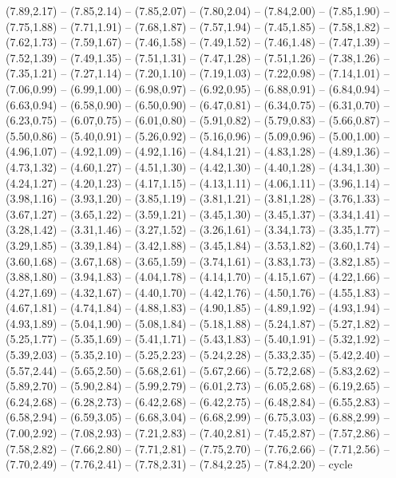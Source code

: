 \expandafter\def\csname geo:gebiet:heute-AUT\endcsname{
  (7.89,2.17) -- (7.85,2.14) -- (7.85,2.07) -- (7.80,2.04) -- (7.84,2.00) -- (7.85,1.90) -- (7.75,1.88) -- (7.71,1.91) -- (7.68,1.87) -- (7.57,1.94) -- (7.45,1.85) -- (7.58,1.82) -- (7.62,1.73) -- (7.59,1.67) -- (7.46,1.58) -- (7.49,1.52) -- (7.46,1.48) -- (7.47,1.39) -- (7.52,1.39) -- (7.49,1.35) -- (7.51,1.31) -- (7.47,1.28) -- (7.51,1.26) -- (7.38,1.26) -- (7.35,1.21) -- (7.27,1.14) -- (7.20,1.10) -- (7.19,1.03) -- (7.22,0.98) -- (7.14,1.01) -- (7.06,0.99) -- (6.99,1.00) -- (6.98,0.97) -- (6.92,0.95) -- (6.88,0.91) -- (6.84,0.94) -- (6.63,0.94) -- (6.58,0.90) -- (6.50,0.90) -- (6.47,0.81) -- (6.34,0.75) -- (6.31,0.70) -- (6.23,0.75) -- (6.07,0.75) -- (6.01,0.80) -- (5.91,0.82) -- (5.79,0.83) -- (5.66,0.87) -- (5.50,0.86) -- (5.40,0.91) -- (5.26,0.92) -- (5.16,0.96) -- (5.09,0.96) -- (5.00,1.00) -- (4.96,1.07) -- (4.92,1.09) -- (4.92,1.16) -- (4.84,1.21) -- (4.83,1.28) -- (4.89,1.36) -- (4.73,1.32) -- (4.60,1.27) -- (4.51,1.30) -- (4.42,1.30) -- (4.40,1.28) -- (4.34,1.30) -- (4.24,1.27) -- (4.20,1.23) -- (4.17,1.15) -- (4.13,1.11) -- (4.06,1.11) -- (3.96,1.14) -- (3.98,1.16) -- (3.93,1.20) -- (3.85,1.19) -- (3.81,1.21) -- (3.81,1.28) -- (3.76,1.33) -- (3.67,1.27) -- (3.65,1.22) -- (3.59,1.21) -- (3.45,1.30) -- (3.45,1.37) -- (3.34,1.41) -- (3.28,1.42) -- (3.31,1.46) -- (3.27,1.52) -- (3.26,1.61) -- (3.34,1.73) -- (3.35,1.77) -- (3.29,1.85) -- (3.39,1.84) -- (3.42,1.88) -- (3.45,1.84) -- (3.53,1.82) -- (3.60,1.74) -- (3.60,1.68) -- (3.67,1.68) -- (3.65,1.59) -- (3.74,1.61) -- (3.83,1.73) -- (3.82,1.85) -- (3.88,1.80) -- (3.94,1.83) -- (4.04,1.78) -- (4.14,1.70) -- (4.15,1.67) -- (4.22,1.66) -- (4.27,1.69) -- (4.32,1.67) -- (4.40,1.70) -- (4.42,1.76) -- (4.50,1.76) -- (4.55,1.83) -- (4.67,1.81) -- (4.74,1.84) -- (4.88,1.83) -- (4.90,1.85) -- (4.89,1.92) -- (4.93,1.94) -- (4.93,1.89) -- (5.04,1.90) -- (5.08,1.84) -- (5.18,1.88) -- (5.24,1.87) -- (5.27,1.82) -- (5.25,1.77) -- (5.35,1.69) -- (5.41,1.71) -- (5.43,1.83) -- (5.40,1.91) -- (5.32,1.92) -- (5.39,2.03) -- (5.35,2.10) -- (5.25,2.23) -- (5.24,2.28) -- (5.33,2.35) -- (5.42,2.40) -- (5.57,2.44) -- (5.65,2.50) -- (5.68,2.61) -- (5.67,2.66) -- (5.72,2.68) -- (5.83,2.62) -- (5.89,2.70) -- (5.90,2.84) -- (5.99,2.79) -- (6.01,2.73) -- (6.05,2.68) -- (6.19,2.65) -- (6.24,2.68) -- (6.28,2.73) -- (6.42,2.68) -- (6.42,2.75) -- (6.48,2.84) -- (6.55,2.83) -- (6.58,2.94) -- (6.59,3.05) -- (6.68,3.04) -- (6.68,2.99) -- (6.75,3.03) -- (6.88,2.99) -- (7.00,2.92) -- (7.08,2.93) -- (7.21,2.83) -- (7.40,2.81) -- (7.45,2.87) -- (7.57,2.86) -- (7.58,2.82) -- (7.66,2.80) -- (7.71,2.81) -- (7.75,2.70) -- (7.76,2.66) -- (7.71,2.56) -- (7.70,2.49) -- (7.76,2.41) -- (7.78,2.31) -- (7.84,2.25) -- (7.84,2.20) -- cycle}
